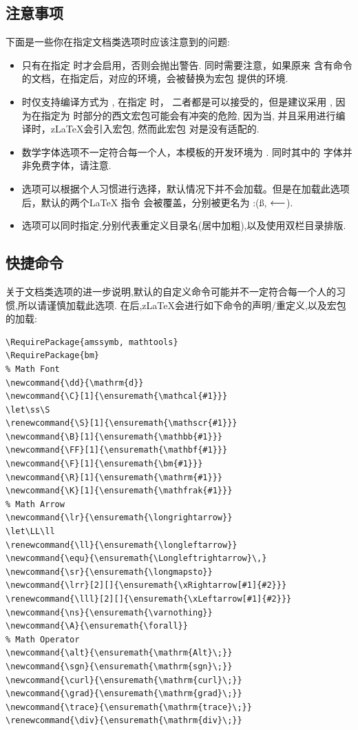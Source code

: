 \subsection{注意事项}
下面是一些你在指定文档类选项时应该注意到的问题:
\begin{itemize}
    \item {} 只有在指定 时才会启用，否则会抛出警告. 同时需要注意，如果原来
        含有\cmd{\marginpar}命令的文档，在指定后，对应的\cmd{\marginpar}环境，会被替换为宏包
        提供的环境.
    \item {} 时仅支持编译方式为 , 在指定 时，
        二者都是可以接受的，但是建议采用 , 因为在指定为 时部分的西文宏包可能会有冲突的危险,
        因为当, 并且采用进行编译时，z\LaTeX{}会引入宏包, 然而此宏包
        对是没有适配的.
    \item 数学字体选项不一定符合每一个人，本模板的开发环境为 . 同时其中的
        字体并非免费字体，请注意.
    \item {}选项可以根据个人习惯进行选择，默认情况下并不会加载。但是在加载此选项后，默认的两个\LaTeX{}
        指令\cmd{\S, \ll} 会被覆盖，分别被更名为 \cmd{\ss, \LL}:(\ss, $\LL$). 
    \item {}选项可以同时指定,分别代表重定义目录名(居中加粗),以及使用双栏目录排版.
\end{itemize}

\subsection{快捷命令}
关于文档类选项的进一步说明,默认的自定义命令可能并不一定符合每一个人的习惯,所以请谨慎加载此选项.
在后,z\LaTeX{}会进行如下命令的声明/重定义,以及宏包的加载:
\begin{verbatim}
\RequirePackage{amssymb, mathtools}
\RequirePackage{bm}          
% Math Font 
\newcommand{\dd}{\mathrm{d}}
\newcommand{\C}[1]{\ensuremath{\mathcal{#1}}}
\let\ss\S
\renewcommand{\S}[1]{\ensuremath{\mathscr{#1}}}
\newcommand{\B}[1]{\ensuremath{\mathbb{#1}}}
\newcommand{\FF}[1]{\ensuremath{\mathbf{#1}}}
\newcommand{\F}[1]{\ensuremath{\bm{#1}}}
\newcommand{\R}[1]{\ensuremath{\mathrm{#1}}}
\newcommand{\K}[1]{\ensuremath{\mathfrak{#1}}}
% Math Arrow 
\newcommand{\lr}{\ensuremath{\longrightarrow}}
\let\LL\ll
\renewcommand{\ll}{\ensuremath{\longleftarrow}}
\newcommand{\equ}{\ensuremath{\Longleftrightarrow}\,}
\newcommand{\sr}{\ensuremath{\longmapsto}}
\newcommand{\lrr}[2][]{\ensuremath{\xRightarrow[#1]{#2}}}
\renewcommand{\lll}[2][]{\ensuremath{\xLeftarrow[#1]{#2}}}
\newcommand{\ns}{\ensuremath{\varnothing}}
\newcommand{\A}{\ensuremath{\forall}}
% Math Operator
\newcommand{\alt}{\ensuremath{\mathrm{Alt}\;}}
\newcommand{\sgn}{\ensuremath{\mathrm{sgn}\;}}
\newcommand{\curl}{\ensuremath{\mathrm{curl}\;}}
\newcommand{\grad}{\ensuremath{\mathrm{grad}\;}}
\newcommand{\trace}{\ensuremath{\mathrm{trace}\;}}
\renewcommand{\div}{\ensuremath{\mathrm{div}\;}}
\end{verbatim}

